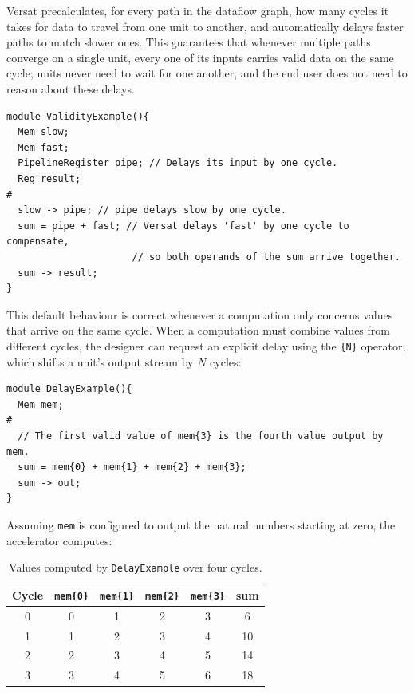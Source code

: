 %

Versat precalculates, for every path in the dataflow graph, how many cycles
it takes for data to travel from one unit to another, and automatically
delays faster paths to match slower ones. This guarantees that whenever
multiple paths converge on a single unit, every one of its inputs carries
valid data on the same cycle; units never need to wait for one another, and
the end user does not need to reason about these delays.

\begin{lstlisting}
module ValidityExample(){
  Mem slow;
  Mem fast;
  PipelineRegister pipe; // Delays its input by one cycle.
  Reg result;
#
  slow -> pipe; // pipe delays slow by one cycle.
  sum = pipe + fast; // Versat delays 'fast' by one cycle to compensate,
                      // so both operands of the sum arrive together.
  sum -> result;
}
\end{lstlisting}

This default behaviour is correct whenever a computation only concerns
values that arrive on the same cycle. When a computation must combine
values from different cycles, the designer can request an explicit delay
using the \texttt{\{N\}} operator, which shifts a unit's output stream by
$N$ cycles:

\begin{lstlisting}
module DelayExample(){
  Mem mem;
#
  // The first valid value of mem{3} is the fourth value output by mem.
  sum = mem{0} + mem{1} + mem{2} + mem{3};
  sum -> out;
}
\end{lstlisting}

Assuming \texttt{mem} is configured to output the natural numbers starting
at zero, the accelerator computes:

\begin{table}[H]
\centering
\begin{tabular}{|c|c|c|c|c|c|}
\hline
\rowcolor{iob-green}
\textbf{Cycle} & \texttt{mem\{0\}} & \texttt{mem\{1\}} & \texttt{mem\{2\}} & \texttt{mem\{3\}} & \textbf{sum} \\
\hline
0 & 0 & 1 & 2 & 3 & 6 \\
1 & 1 & 2 & 3 & 4 & 10 \\
2 & 2 & 3 & 4 & 5 & 14 \\
3 & 3 & 4 & 5 & 6 & 18 \\
\hline
\end{tabular}
\caption{Values computed by \texttt{DelayExample} over four cycles.}
\label{tab:data_validity}
\end{table}
